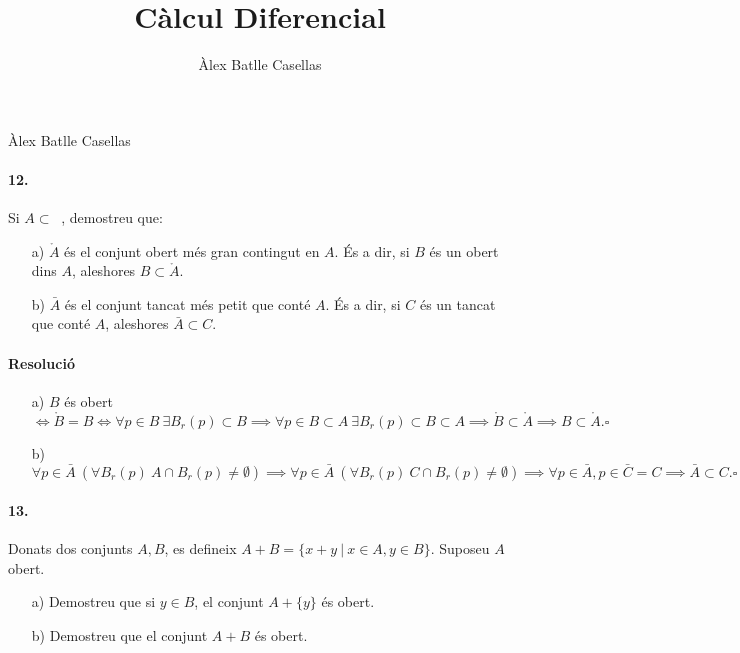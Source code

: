 \documentclass[11pt]{article}
\title{Càlcul Diferencial}
\author{Àlex Batlle Casellas}
\DeclareMathOperator{\Rm}{\mathbb{R}^m}
\begin{document}
\begin{small}
Àlex Batlle Casellas
\end{small}
\paragraph{12.} Si $A\subset\Rm$, demostreu que:
\begin{itemize}
	\item[a)] $\mathring A$ és el conjunt obert més gran contingut en $A$. És a dir, si $B$ és un obert dins $A$, aleshores $B\subset\mathring A$.
	\item[b)] $\bar{A}$ és el conjunt tancat més petit que conté $A$. És a dir, si $C$ és un tancat que conté $A$, aleshores $
\bar{A}\subset C$.
\end{itemize}
\paragraph{Resolució}
\begin{itemize}
	\item[a)] $B$ és obert$\iff\mathring B=B\iff\forall p\in B\ \exists B_r(p)\subset B\implies\forall p\in B\subset A\ \exists B_r(p)\subset B\subset A\implies\mathring B\subset\mathring A\implies B\subset\mathring A.\square$
	\item[b)] $\forall p\in\bar{A}\ (\forall B_r(p)\ A\cap B_r(p)\neq\emptyset)\implies\forall p\in\bar{A}\ (\forall B_r(p)\ C\cap B_r(p)\neq\emptyset)\implies\forall p\in\bar{A},p\in\bar{C}=C\implies\bar{A}\subset C.\square$
\end{itemize}
\paragraph{13.} Donats dos conjunts $A,B$, es defineix $A+B=\{x+y\ \vert\ x\in A, y\in B\}$. Suposeu $A$ obert.
\begin{itemize}
	\item[a)] Demostreu que si $y\in B$, el conjunt $A+\{y\}$ és obert.
	\item[b)] Demostreu que el conjunt $A+B$ és obert.
\end{itemize}
\end{document}
